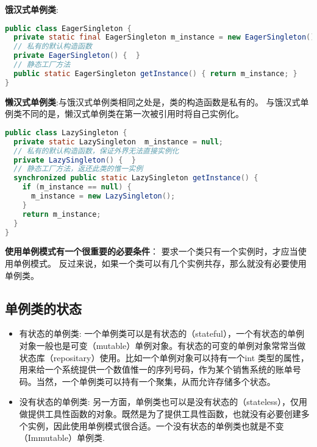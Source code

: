 \documentclass[../main.tex]{subfiles}
\begin{document}
\textbf{饿汉式单例类}:
\begin{lstlisting}[language=java]
public class EagerSingleton {
  private static final EagerSingleton m_instance = new EagerSingleton();
  // 私有的默认构造函数
  private EagerSingleton() {  }
  // 静态工厂方法
  public static EagerSingleton getInstance() { return m_instance; }
}
\end{lstlisting}
%
\noindent \textbf{懒汉式单例类}:与饿汉式单例类相同之处是，类的构造函数是私有的。
与饿汉式单例类不同的是，懒汉式单例类在第一次被引用时将自己实例化。
\begin{lstlisting}[language=java]
public class LazySingleton {
  private static LazySingleton  m_instance = null;
  // 私有的默认构造函数，保证外界无法直接实例化
  private LazySingleton() {  }
  // 静态工厂方法，返还此类的惟一实例
  synchronized public static LazySingleton getInstance() {
    if (m_instance == null) {
      m_instance = new LazySingleton();
    }
    return m_instance;
  }
}
\end{lstlisting}
%
\textbf{使用单例模式有一个很重要的必要条件}：
要求一个类只有一个实例时，才应当使用单例模式。
反过来说，如果一个类可以有几个实例共存，那么就没有必要使用单例类。
%
\subsection{单例类的状态}
\begin{itemize}
  \item 有状态的单例类: 一个单例类可以是有状态的（stateful），一个有状态的单例对象一般也是可变（mutable）单例对象。有状态的可变的单例对象常常当做状态库（repositary）使用。比如一个单例对象可以持有一个int 类型的属性，用来给一个系统提供一个数值惟一的序列号码，作为某个销售系统的账单号码。当然，一个单例类可以持有一个聚集，从而允许存储多个状态。
  \item 没有状态的单例类: 另一方面，单例类也可以是没有状态的（stateless），仅用做提供工具性函数的对象。既然是为了提供工具性函数，也就没有必要创建多个实例，因此使用单例模式很合适。一个没有状态的单例类也就是不变（Immutable）单例类.
\end{itemize}
%
\end{document}
